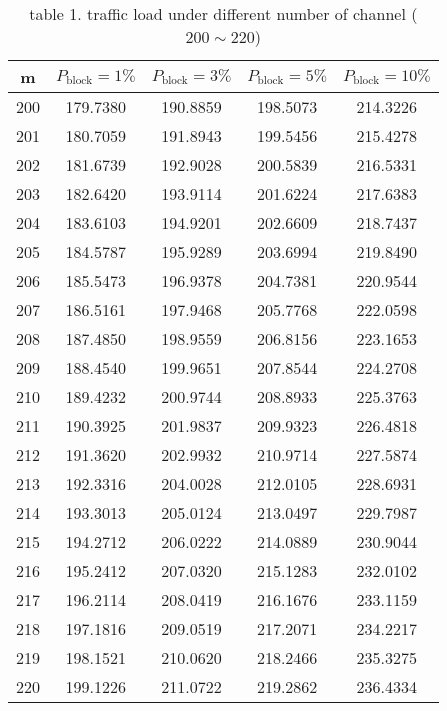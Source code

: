 \begin{table}[H]
    \begin{center}
        \begin{tabular}{|c|c|c|c|c|}
            \hline
            \textbf{m} & \textbf{$P_{\text{block}} = 1\%$} & \textbf{$P_{\text{block}} = 3\%$} & \textbf{$P_{\text{block}} = 5\%$} & \textbf{$P_{\text{block}} = 10\%$} \\
            \hline
            200 & 179.7380 & 190.8859 & 198.5073 & 214.3226 \\
            \hline
            201 & 180.7059 & 191.8943 & 199.5456 & 215.4278 \\
            \hline
            202 & 181.6739 & 192.9028 & 200.5839 & 216.5331 \\
            \hline
            203 & 182.6420 & 193.9114 & 201.6224 & 217.6383 \\
            \hline
            204 & 183.6103 & 194.9201 & 202.6609 & 218.7437 \\
            \hline
            205 & 184.5787 & 195.9289 & 203.6994 & 219.8490 \\
            \hline
            206 & 185.5473 & 196.9378 & 204.7381 & 220.9544 \\
            \hline
            207 & 186.5161 & 197.9468 & 205.7768 & 222.0598 \\
            \hline
            208 & 187.4850 & 198.9559 & 206.8156 & 223.1653 \\
            \hline
            209 & 188.4540 & 199.9651 & 207.8544 & 224.2708 \\
            \hline
            210 & 189.4232 & 200.9744 & 208.8933 & 225.3763 \\
            \hline
            211 & 190.3925 & 201.9837 & 209.9323 & 226.4818 \\
            \hline
            212 & 191.3620 & 202.9932 & 210.9714 & 227.5874 \\
            \hline
            213 & 192.3316 & 204.0028 & 212.0105 & 228.6931 \\
            \hline
            214 & 193.3013 & 205.0124 & 213.0497 & 229.7987 \\
            \hline
            215 & 194.2712 & 206.0222 & 214.0889 & 230.9044 \\
            \hline
            216 & 195.2412 & 207.0320 & 215.1283 & 232.0102 \\
            \hline
            217 & 196.2114 & 208.0419 & 216.1676 & 233.1159 \\
            \hline
            218 & 197.1816 & 209.0519 & 217.2071 & 234.2217 \\
            \hline
            219 & 198.1521 & 210.0620 & 218.2466 & 235.3275 \\
            \hline
            220 & 199.1226 & 211.0722 & 219.2862 & 236.4334 \\
            \hline
        \end{tabular}
        \caption{table 1. traffic load under different number of channel ($200 \sim 220$)}
    \end{center}
\end{table}
